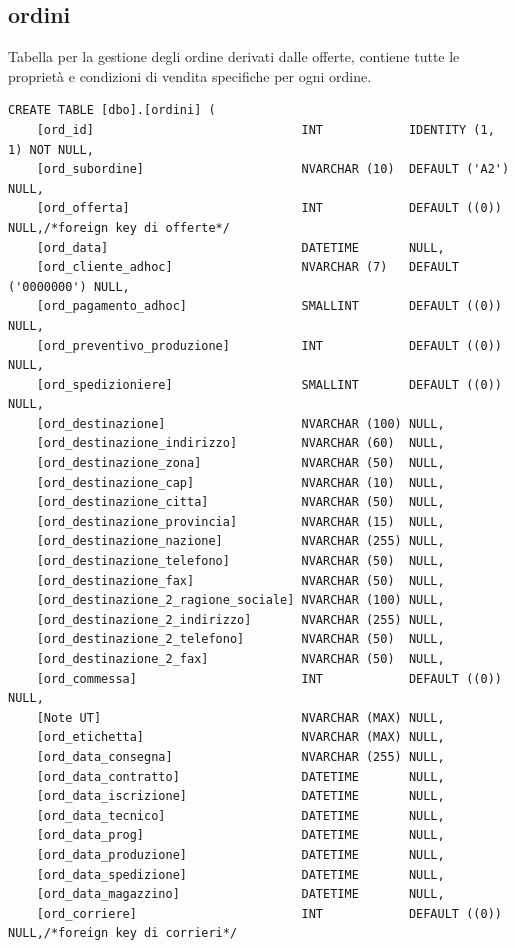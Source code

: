 \documentclass[12pt]{article}
\begin{document}
\subsection{ordini}
Tabella per la gestione degli ordine derivati dalle offerte, contiene tutte le proprietà e condizioni di vendita specifiche per ogni ordine.
\begin{lstlisting}
CREATE TABLE [dbo].[ordini] (
    [ord_id]                             INT            IDENTITY (1, 1) NOT NULL,
    [ord_subordine]                      NVARCHAR (10)  DEFAULT ('A2') NULL,
    [ord_offerta]                        INT            DEFAULT ((0)) NULL,/*foreign key di offerte*/
    [ord_data]                           DATETIME       NULL,
    [ord_cliente_adhoc]                  NVARCHAR (7)   DEFAULT ('0000000') NULL,
    [ord_pagamento_adhoc]                SMALLINT       DEFAULT ((0)) NULL,
    [ord_preventivo_produzione]          INT            DEFAULT ((0)) NULL,
    [ord_spedizioniere]                  SMALLINT       DEFAULT ((0)) NULL, 
    [ord_destinazione]                   NVARCHAR (100) NULL,   
    [ord_destinazione_indirizzo]         NVARCHAR (60)  NULL,   
    [ord_destinazione_zona]              NVARCHAR (50)  NULL,   
    [ord_destinazione_cap]               NVARCHAR (10)  NULL,   
    [ord_destinazione_citta]             NVARCHAR (50)  NULL,   
    [ord_destinazione_provincia]         NVARCHAR (15)  NULL,   
    [ord_destinazione_nazione]           NVARCHAR (255) NULL,   
    [ord_destinazione_telefono]          NVARCHAR (50)  NULL,   
    [ord_destinazione_fax]               NVARCHAR (50)  NULL,   
    [ord_destinazione_2_ragione_sociale] NVARCHAR (100) NULL,   
    [ord_destinazione_2_indirizzo]       NVARCHAR (255) NULL,   
    [ord_destinazione_2_telefono]        NVARCHAR (50)  NULL,   
    [ord_destinazione_2_fax]             NVARCHAR (50)  NULL,   
    [ord_commessa]                       INT            DEFAULT ((0)) NULL,
    [Note UT]                            NVARCHAR (MAX) NULL,
    [ord_etichetta]                      NVARCHAR (MAX) NULL,
    [ord_data_consegna]                  NVARCHAR (255) NULL,
    [ord_data_contratto]                 DATETIME       NULL,
    [ord_data_iscrizione]                DATETIME       NULL,
    [ord_data_tecnico]                   DATETIME       NULL,
    [ord_data_prog]                      DATETIME       NULL,
    [ord_data_produzione]                DATETIME       NULL,
    [ord_data_spedizione]                DATETIME       NULL,
    [ord_data_magazzino]                 DATETIME       NULL,
    [ord_corriere]                       INT            DEFAULT ((0)) NULL,/*foreign key di corrieri*/

\end{lstlisting}
\end{document}
